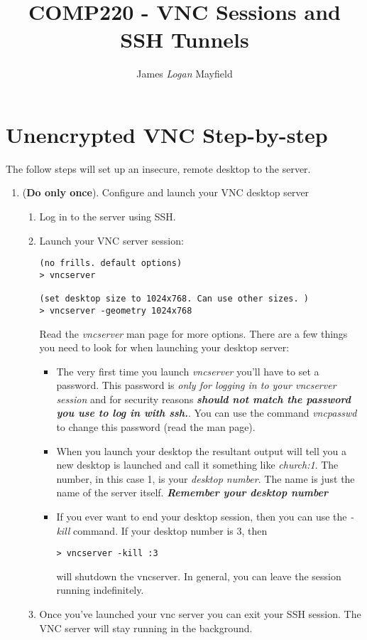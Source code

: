 \documentclass[10pt]{article}
\title{COMP220 - VNC Sessions and SSH Tunnels}
\author{James \textit{Logan} Mayfield  }
\begin{document}
\maketitle

\section{Unencrypted VNC Step-by-step}

The follow steps will set up an insecure, remote desktop to the server.
\begin{enumerate}
\item (\textbf{Do only once}). Configure and launch your VNC desktop server
\begin{enumerate}
\item Log in to the server using SSH.
\item Launch your VNC server session:
\begin{verbatim}
(no frills. default options)
> vncserver

(set desktop size to 1024x768. Can use other sizes. )
> vncserver -geometry 1024x768
\end{verbatim}
Read the \textit{vncserver} man page for more options.  There are a few things you need to look for when launching your desktop server:
\begin{itemize}
\item The very first time you launch \textit{vncserver} you'll have to set a password.  This password is \textit{only for logging in to your vncserver session} and for security reasons \textbf{\textit{should not match the password you use to log in with ssh.}}.  You can use the command \textit{vncpasswd} to change this password (read the man page).
\item When you launch your desktop the resultant output will tell you a new desktop is launched and call it something like \textit{church:1}.  The number, in this case 1, is your \textit{desktop number}. The name is just the name of the server itself. \textit{\textbf{Remember your desktop number}}
\item If you ever want to end your desktop session, then you can use the \textit{-kill} command. If your desktop number is $3$, then
\begin{verbatim}
> vncserver -kill :3
\end{verbatim}
will shutdown the vncserver. In general, you can leave the session running indefinitely. 
\end{itemize}
\item Once you've launched your vnc server you can exit your SSH session. The VNC server will stay running in the background.
\end{enumerate}


\end{enumerate}
\end{document}
